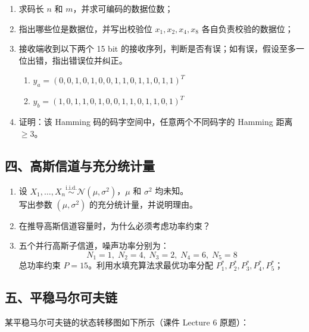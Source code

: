 \documentclass[12pt,a4paper]{ctexart}
\newcommand{\iid}{\overset{\text{i.i.d.}}{\sim}}
\begin{document}
\begin{enumerate}[label=(\arabic*), nosep]
  \item 求码长 $n$ 和 $m$，并求可编码的数据位数；
  \item 指出哪些位是数据位，并写出校验位 $x_1, x_2, x_4, x_8$ 各自负责校验的数据位；
  \item 接收端收到以下两个 15 bit 的接收序列，判断是否有误；如有误，假设至多一位出错，指出错误位并纠正。
  \begin{enumerate}
    \item $y_a = (0,0,1,0,1,0,0,1,1,0,1,1,0,1,1)^T$
    \item $y_b = (1,0,1,1,0,1,0,0,1,1,0,1,1,0,1)^T$
  \end{enumerate}
  \item 证明：该 Hamming 码的码字空间中，任意两个不同码字的 Hamming 距离 $\geq 3$。
\end{enumerate}

\subsection*{四、高斯信道与充分统计量}

\begin{enumerate}[label=(\arabic*), nosep]
  \item 设 $X_1,\ldots,X_n \iid \mathcal{N}(\mu, \sigma^2)$，$\mu$ 和 $\sigma^2$ 均未知。\\
  写出参数 $(\mu, \sigma^2)$ 的充分统计量，并说明理由。

  \item 在推导高斯信道容量时，为什么必须考虑功率约束？

  \item 五个并行高斯子信道，噪声功率分别为：
  \[
  N_1=1,\; N_2=4,\; N_3=2,\; N_4=6,\; N_5=8
  \]
  总功率约束 $P = 15$。利用水填充算法求最优功率分配 $P_1^*, P_2^*, P_3^*, P_4^*, P_5^*$；

\end{enumerate}

\subsection*{五、平稳马尔可夫链}

某平稳马尔可夫链的状态转移图如下所示（课件 Lecture 6 原题）：
\end{document}
